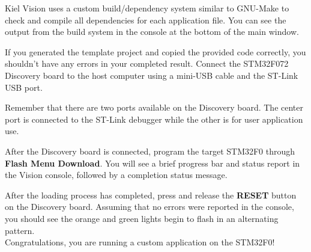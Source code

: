 \documentclass[11pt,fleqn]{book} %
\begin{document}
Kiel {\textmu}Vision uses a custom build/dependency system similar to GNU-Make to check and compile all dependencies for each application file. You can see the output from the build system in the console at the bottom of the main window.

If you generated the template project and copied the provided code correctly, you shouldn't have any errors in your completed result. Connect the STM32F072 Discovery board to the host computer using a mini-USB cable and the ST-Link USB port. 

\begin{warning}
	Remember that there are two ports available on the Discovery board. The center port is connected to the ST-Link debugger while the other is for user application use.
\end{warning}

After the Discovery board is connected, program the target STM32F0 through \textbf{Flash Menu \textrightarrow Download}. You will see a brief progress bar and status report in the {\textmu}Vision console, followed by a completion status message. 

After the loading process has completed, press and release the \textbf{RESET} button on the Discovery board. Assuming that no errors were reported in the console, you should see the orange and green lights begin to flash in an alternating pattern. \\

Congratulations, you are running a custom application on the STM32F0! 







\end{document}
